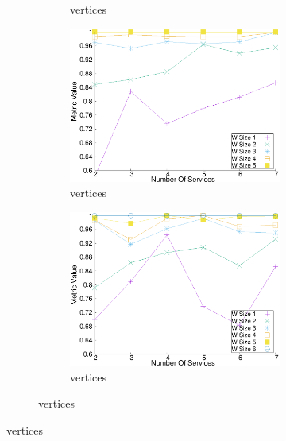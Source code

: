 \begin{figure}[H]
\begin{adjustbox}{minipage=\linewidth,scale=0.75}
\begin{subfigure}{0.45\textwidth}
\begin{subfigure}{\textwidth}
      \caption{ vertices}
      \label{fig:quality_window_wide_perce_n4}
    \end{subfigure}
    \begin{subfigure}{\textwidth}
      \includegraphics[width=\textwidth]{Images/graphs/window_quality_performance_diff_perce_n7_s7_20_100_n5}
      \caption{ vertices}

      \label{fig:quality_window_wide_perce_n5}
    \end{subfigure}

      \begin{subfigure}{\textwidth}
      \includegraphics[width=\textwidth]{Images/graphs/window_quality_performance_diff_perce_n7_s7_20_100_n6}
      \caption{ vertices}
      \label{fig:quality_window_wide_perce_n6}
    \end{subfigure}


\end{subfigure}
\end{adjustbox}
\end{figure}
